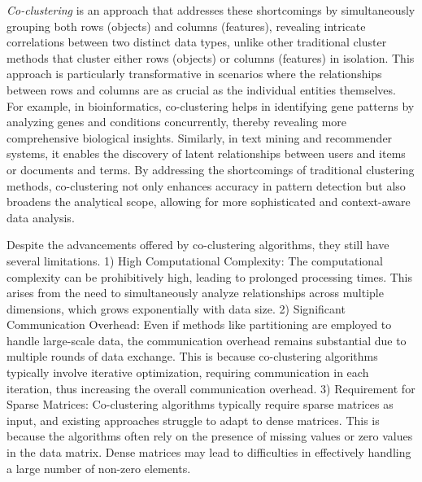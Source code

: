 \textit{Co-clustering}\cite{cheng2000BiclusteringExpressionData, kluger2003SpectralBiclusteringMicroarray, yan2017CoclusteringMultidimensionalBig} is an approach that addresses these shortcomings by simultaneously grouping both rows (objects) and columns (features), revealing intricate correlations between two distinct data types, unlike other traditional cluster methods\cite{zhang2023AdaptiveGraphConvolution, yuan2023JointNetworkTopology, wu2023EffectiveClusteringStructured} that cluster either rows (objects) or columns (features) in isolation. This approach is particularly transformative in scenarios where the relationships between rows and columns are as crucial as the individual entities themselves. For example, in bioinformatics, co-clustering helps in identifying gene patterns by analyzing genes and conditions concurrently, thereby revealing more comprehensive biological insights\cite{higham2007SpectralClusteringIts, kluger2003SpectralBiclusteringMicroarray, madeira2004BiclusteringAlgorithmsBiological, zhao2012BiclusteringAnalysisPattern, golchev2015BiclusteringAnalysisGene}. Similarly, in text mining and recommender systems, it enables the discovery of latent relationships between users and items or documents and terms\cite{busygin2008BiclusteringDataMining, dhillon2001CoclusteringDocumentsWords, dhillon2007WeightedGraphCuts, chen2023ParallelNonNegativeMatrix, bouchareb2019ModelBasedCoclustering}. By addressing the shortcomings of traditional clustering methods, co-clustering not only enhances accuracy in pattern detection but also broadens the analytical scope, allowing for more sophisticated and context-aware data analysis.

Despite the advancements offered by co-clustering algorithms, they still have several limitations. 1) High Computational Complexity: The computational complexity can be prohibitively high, leading to prolonged processing times. This arises from the need to simultaneously analyze relationships across multiple dimensions, which grows exponentially with data size.
2) Significant Communication Overhead: Even if methods like partitioning are employed to handle large-scale data, the communication overhead remains substantial due to multiple rounds of data exchange. This is because co-clustering algorithms typically involve iterative optimization, requiring communication in each iteration, thus increasing the overall communication overhead.
3) Requirement for Sparse Matrices: Co-clustering algorithms typically require sparse matrices as input, and existing approaches struggle to adapt to dense matrices. This is because the algorithms often rely on the presence of missing values or zero values in the data matrix. Dense matrices may lead to difficulties in effectively handling a large number of non-zero elements.

